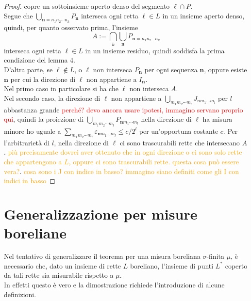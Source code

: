 \documentclass[a4paper, twoside,openright]{article}
\newcommand{\<}{\langle}
\renewcommand{\>}{\rangle}
\begin{document}
\begin{proof}
copre un sottoinsieme aperto denso del segmento $\ell \cap P$.\\
Segue che $\bigcup_{\mathbf{n}=n_{1} n_{2} \cdots n_{k}} P_{\mathbf{n}}$ interseca ogni retta $\ell \in L$ in un insieme aperto denso, quindi, per quanto osservato prima, l'insieme 
$$
A:= \bigcap_{k} \bigcup_{\mathbf{n}} P_{\mathbf{n}=n_{1} n_{2} \cdots n_{k}}
$$
interseca ogni retta $\ell \in L$ in un insieme residuo, quindi soddisfa la prima condizione del lemma 4.\\
D'altra parte, se $\ell \notin L$, o $\ell$ non interseca $P_{\mathbf{n}}$ per ogni sequenza $\mathbf{n}$, oppure esiste $\mathbf{n}$ per cui la direzione di $\ell$ non appartiene a $I_{\mathbf{n}}$.\\
Nel primo caso in particolare si ha che $\ell$ non interseca $A$.\\
Nel secondo caso, la direzione di $\ell$ non appartiene a $\bigcup_{m_{1} m_{2} \cdots m_{l}} J_{n m_{1} \cdots m_{l}}$ per $l$ abbastanza grande \textcolor{red}{perché? devo ancora usare ipotesi, immagino servano proprio qui}, quindi la proiezione di $\bigcup_{m_{1} m_{2} \cdots m_{l}} P_{\mathbf{n} m_{1} \cdots m_{l}}$ nella direzione di $\ell$ ha misura minore ho uguale a $\sum_{m_{1} m_{2} \cdots m_{l}} \varepsilon_{\mathbf{n} m_{1} \cdots m_{l}} \leq c/2^l$ per un'opportuna costante $c$. Per l'arbitrarietà di $l$, nella direzione di $\ell$ ci sono trascurabili rette che intersecano $A$. \textcolor{orange}{più precisamente dovrei aver ottenuto che in ogni direzione o ci sono solo rette che appartengono a $L$, oppure ci sono trascurabili rette. questa cosa può essere vera?}.
\textcolor{orange}{cosa sono i J con indice in basso? immagino siano definiti come gli I con indici in basso}
\end{proof}

\newpage

\section*{Generalizzazione per misure boreliane}

Nel tentativo di generalizzare il teorema per una misura boreliana $\sigma$-finita $\mu$, è necessario che, dato un insieme di rette $L$ boreliano, l'insieme di punti $L^*$ coperto da tali rette sia misurabile rispetto a $\mu$.\\
In effetti questo è vero e la dimostrazione richiede l'introduzione di alcune definizioni. 
\end{document}
